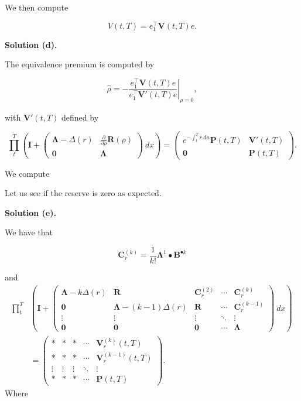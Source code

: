 \documentclass[
]{book}
\begin{document}
We then compute

\[
V(t,T)=e_1^\top \mathbf V(t,T)e.
\]

\textbf{Solution (d).}

The equivalence premium is computed by

\[
\hat \rho = \left.-\frac{e_1^\top \mathbf V(t,T)e}{e_1^\top \mathbf V'(t,T)e}\right\vert_{\rho=0},
\]

with \(\mathbf V'(t,T)\) defined by

\[
\prod_t^T\left(\mathbf I+\begin{pmatrix}
\mathbf \Lambda-\Delta(r) &\frac{\partial}{\partial \rho} \mathbf R(\rho)\\
\mathbf 0 & \mathbf \Lambda
\end{pmatrix}\ dx\right)=
\begin{pmatrix}
e^{-\int_t^Tr\ du}\mathbf P(t,T) & \mathbf V'(t,T)\\
\mathbf 0 & \mathbf P(t,T)
\end{pmatrix}.
\]

We compute

Let us see if the reserve is zero as expected.

\textbf{Solution (e).}

We have that

\[
\mathbf C_r^{(k)}=\frac{1}{k!}\mathbf\Lambda^1\bullet \mathbf B^{\bullet k}
\]

and
\begin{align*}
\prod_t^T&\left(\mathbf I+\begin{pmatrix}
\mathbf \Lambda-k\Delta(r) & \mathbf R & \mathbf C_r^{(2)} & \cdots & \mathbf C_r^{(k)}\\
\mathbf 0 & \mathbf \Lambda - (k-1)\Delta(r) & \mathbf R & \cdots & \mathbf C_r^{(k-1)}\\
\vdots & \vdots & \vdots & \ddots & \vdots \\
\mathbf 0 & \mathbf 0 & \mathbf 0 & \cdots & \mathbf \Lambda
\end{pmatrix}\ dx\right)\\
&=
\begin{pmatrix}
* & * & * & \cdots & \mathbf V_r^{(k)}(t,T)\\
* & * & * & \cdots & \mathbf V_r^{(k-1)}(t,T)\\
\vdots & \vdots & \vdots & \ddots & \vdots \\
* & * &* & \cdots &  \mathbf P(t,T)
\end{pmatrix}.
\end{align*}
Where
\end{document}
